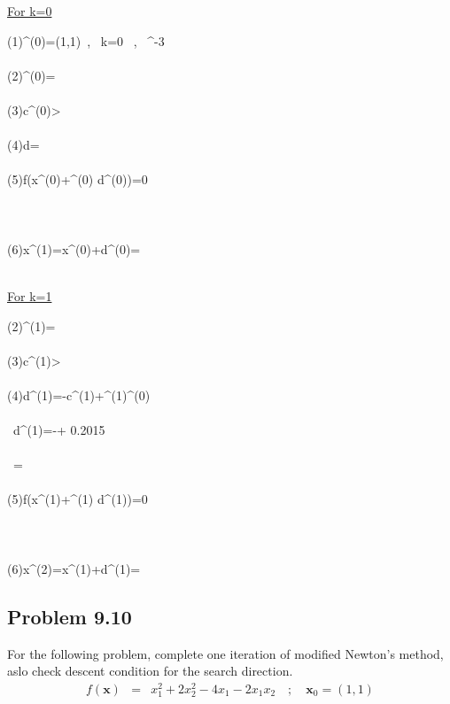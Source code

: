 \documentclass[]{report}
\begin{document}
\underline{For k=0}
\begin{program}
\left(1\right)\quad {}^{(0)}=\left(1,1\right)\ , \, k=0 \ , \ ^{-3}\\~ \\
\left(2\right)\quad {}^{(0)}=\left[22.4599 \ , \ 42.008\right]\\~  \\
\left(3\right)\quad \lvert \mathbf c^{(0)}>\epsilon\\~  \\
\left(4\right)\quad \mathbf d=\left[-22.4599 \ , \ -42.008\right]\\~  \\
\left(5\right)\quad \delta f\left(\mathbf x^{(0)}+\alpha^{(0)} \mathbf d^{(0)}\right)=0\\~\\
\quad \quad \quad {}\\~\\
\left(6\right)\quad \mathbf x^{(1)}=\mathbf x^{(0)}+\mathbf d^{(0)}=\left[0.4215\ , \ -0.0819\right]
\end{program}
~\\
\underline{For k=1}
\begin{program}
\left(2\right)\quad {}^{(1)}=\left[8.465 \ , \ -4.5259\right]\\~  \\
\left(3\right)\quad \lvert \mathbf c^{(1)}>\epsilon\\~  \\
\left(4\right)\quad \mathbf d^{(1)}=-\mathbf c^{(1)}+\beta^{(1)}^{(0)}\\~  \\
\quad \quad \ \mathbf d^{(1)}=-\left[8.465 \ , \ -4.5259\right]+ 0.2015 \left[-22.4599 \ , \ 42.008\right]\\~  \\
\quad \quad \quad \  \quad=\left[-12.9909 \ , \ 12.9909 \right] \\~  \\
\left(5\right)\quad \delta f\left(\mathbf x^{(1)}+\alpha^{(1)} \mathbf d^{(1)}\right)=0\\~\\
\quad \quad \quad {}\\~\\
\left(6\right)\quad \mathbf x^{(2)}=\mathbf x^{(1)}+\mathbf d^{(1)}=\left[0.2294\ , \ 0.1133\right]
\end{program}
\subsection*{Problem 9.10}
For the following problem, complete one iteration of modified Newton's method, aslo check descent condition for the search direction.
\begin{eqnarray*}
f\left(\mathbf x\right)&=&x_1^2+2x_2^2-4x_1-2x_1x_2 \quad ; \quad \mathbf{x}_0=\left(1,1\right)
\end{eqnarray*}
\end{document}

